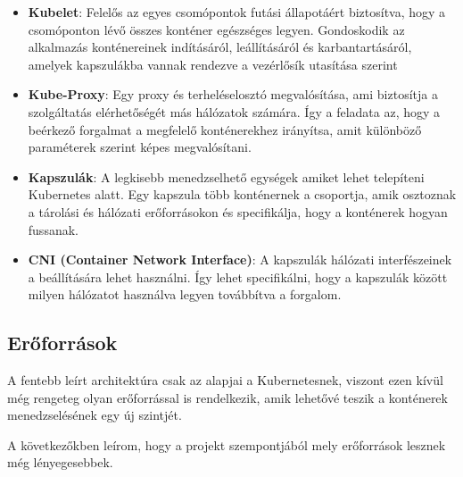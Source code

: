 \begin{itemize}
	\item \textbf{Kubelet}: Felelős az egyes csomópontok futási állapotáért biztosítva, 
	hogy a csomóponton lévő összes konténer egészséges legyen. Gondoskodik az alkalmazás
	konténereinek indításáról, leállításáról és karbantartásáról, amelyek kapszulákba 
	vannak rendezve a vezérlősík utasítása szerint
	\item \textbf{Kube-Proxy}: Egy proxy és terheléselosztó megvalósítása, ami biztosítja
	a szolgáltatás elérhetőségét más hálózatok számára. Így a feladata az, hogy a beérkező
	forgalmat a megfelelő konténerekhez irányítsa, amit különböző paraméterek szerint képes
	megvalósítani.
	\item \textbf{Kapszulák}: A legkisebb menedzselhető egységek amiket lehet telepíteni
	Kubernetes alatt. Egy kapszula több konténernek a csoportja, amik osztoznak a tárolási
	és hálózati erőforrásokon és specifikálja, hogy a konténerek hogyan fussanak. 
	\item \textbf{CNI (Container Network Interface)}: A kapszulák hálózati interfészeinek
	a beállítására lehet használni. Így lehet specifikálni, hogy a kapszulák között 
	milyen hálózatot használva legyen továbbítva a forgalom. 
\end{itemize}

\subsection{Erőforrások}

A fentebb leírt architektúra csak az alapjai a Kubernetesnek, viszont ezen kívül
még rengeteg olyan erőforrással is rendelkezik, amik lehetővé teszik a konténerek
menedzselésének egy új szintjét.

A következőkben leírom, hogy a projekt szempontjából mely erőforrások lesznek még
lényegesebbek. 

